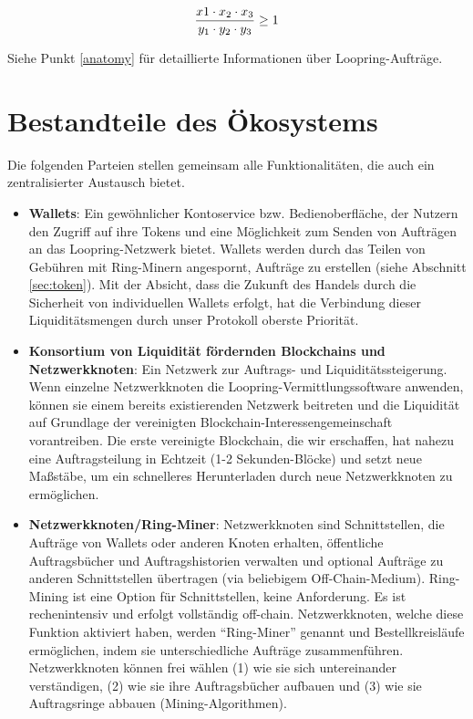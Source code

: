 \documentclass[UTF8,nofonts]{article}
\begin{document}
\begin{multicols}{2}
\begin{equation}
{{x1 \cdot x_2 \cdot x_3 \over y_1 \cdot y_2 \cdot y_3} \geq 1}
\end{equation}


Siehe Punkt \ref{anatomy} für detaillierte Informationen über Loopring-Aufträge.



\section{Bestandteile des Ökosystems\label{sec:ecosystem}}
Die folgenden Parteien stellen gemeinsam alle Funktionalitäten, die auch ein zentralisierter Austausch bietet.

\begin{itemize}

\item \textbf{Wallets}: Ein gewöhnlicher Kontoservice bzw. Bedienoberfläche, der Nutzern den Zugriff auf ihre Tokens und eine Möglichkeit zum Senden von Aufträgen an das Loopring-Netzwerk bietet. Wallets werden durch das Teilen von Gebühren mit Ring-Minern angespornt, Aufträge zu erstellen (siehe Abschnitt \ref{sec:token}). Mit der Absicht, dass die Zukunft des Handels durch die Sicherheit von individuellen Wallets erfolgt, hat die Verbindung dieser Liquiditätsmengen durch unser Protokoll oberste Priorität.

\item \textbf{Konsortium von Liquidität fördernden Blockchains und Netzwerkknoten}: Ein Netzwerk zur Auftrags- und Liquiditätssteigerung. Wenn einzelne Netzwerkknoten die Loopring-Vermittlungssoftware anwenden, können sie einem bereits existierenden Netzwerk beitreten und die Liquidität auf Grundlage der vereinigten Blockchain-Interessengemeinschaft vorantreiben. Die erste vereinigte Blockchain, die wir erschaffen, hat nahezu eine Auftragsteilung in Echtzeit (1-2 Sekunden-Blöcke) und setzt neue Maßstäbe, um ein schnelleres Herunterladen durch neue Netzwerkknoten zu ermöglichen.

\item \textbf{Netzwerkknoten/Ring-Miner}: Netzwerkknoten sind Schnittstellen, die Aufträge von Wallets oder anderen Knoten erhalten, öffentliche Auftragsbücher und Auftragshistorien verwalten und optional Aufträge zu anderen Schnittstellen übertragen (via beliebigem Off-Chain-Medium). Ring-Mining ist eine Option für Schnittstellen, keine Anforderung. Es ist rechenintensiv und erfolgt vollständig off-chain. Netzwerkknoten, welche diese Funktion aktiviert haben, werden \enquote{Ring-Miner} genannt und Bestellkreisläufe ermöglichen, indem sie unterschiedliche Aufträge zusammenführen. Netzwerkknoten können frei wählen (1) wie sie sich untereinander verständigen, (2) wie sie ihre Auftragsbücher aufbauen und (3) wie sie Auftragsringe abbauen (Mining-Algorithmen).


\end{itemize}
\end{multicols}
\end{document}
